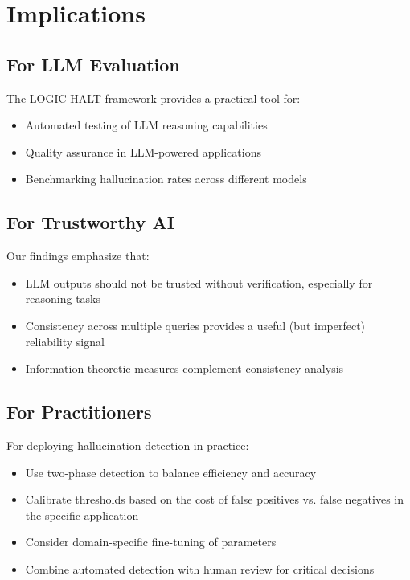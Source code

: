 \section{Implications}

\subsection{For LLM Evaluation}

The LOGIC-HALT framework provides a practical tool for:
\begin{itemize}
    \item Automated testing of LLM reasoning capabilities
    \item Quality assurance in LLM-powered applications
    \item Benchmarking hallucination rates across different models
\end{itemize}

\subsection{For Trustworthy AI}

Our findings emphasize that:
\begin{itemize}
    \item LLM outputs should not be trusted without verification, especially for reasoning tasks
    \item Consistency across multiple queries provides a useful (but imperfect) reliability signal
    \item Information-theoretic measures complement consistency analysis
\end{itemize}

\subsection{For Practitioners}

For deploying hallucination detection in practice:
\begin{itemize}
    \item Use two-phase detection to balance efficiency and accuracy
    \item Calibrate thresholds based on the cost of false positives vs. false negatives in the specific application
    \item Consider domain-specific fine-tuning of parameters
    \item Combine automated detection with human review for critical decisions
\end{itemize}

